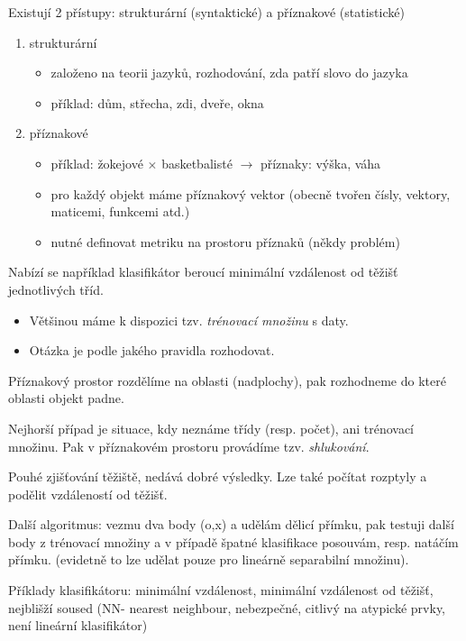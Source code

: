 Existují 2 přístupy: strukturární (syntaktické) a  příznakové (statistické)
\begin{enumerate}
\item strukturární
\begin{itemize}
\item založeno na teorii jazyků, rozhodování, zda patří slovo do jazyka
\item příklad: dům, střecha, zdi, dveře, okna
\end{itemize}
\item příznakové
\begin{itemize}
\item příklad: žokejové $\times$ basketbalisté $\rightarrow$ příznaky: výška, váha
\item pro každý objekt máme příznakový vektor (obecně tvořen čísly, vektory, maticemi, funkcemi atd.)
\item nutné definovat metriku na prostoru příznaků (někdy problém)
\end{itemize}
\end{enumerate}


Nabízí se například klasifikátor beroucí minimální vzdálenost od těžišť jednotlivých tříd.

\begin{itemize}
\item Většinou máme k dispozici tzv. {\em trénovací množinu} s daty.
\item Otázka je podle jakého pravidla rozhodovat.
\end{itemize}
Příznakový prostor rozdělíme na oblasti (nadplochy), pak rozhodneme do které oblasti objekt padne.

Nejhorší případ je situace, kdy neznáme třídy (resp. počet), ani trénovací množinu. Pak v příznakovém prostoru
provádíme tzv. {\em shlukování}.


Pouhé zjišťování těžiště, nedává dobré výsledky. Lze také počítat rozptyly a podělit vzdáleností od těžišť.


Další algoritmus: vezmu dva body (o,x) a udělám dělicí přímku, pak testuji další body z trénovací množiny
a v případě špatné klasifikace posouvám, resp. natáčím přímku. (evidetně to lze udělat pouze pro lineárně separabilní
množinu).

Příklady klasifikátoru: minimální vzdálenost, minimální vzdálenost od těžišť, nejblišží soused (NN- nearest neighbour,
nebezpečné, citlivý na atypické prvky, není lineární klasifikátor)

